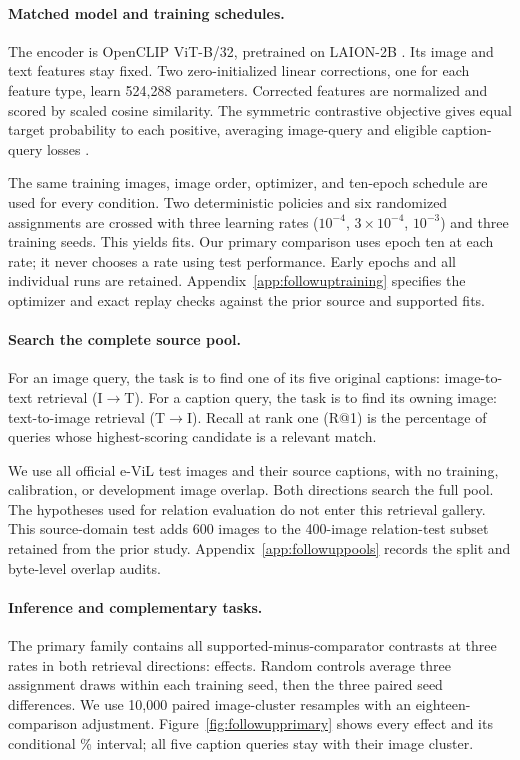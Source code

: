 \documentclass[11pt]{article}
\begin{document}
\paragraph{Matched model and training schedules.}
The encoder is OpenCLIP ViT-B/32, pretrained on LAION-2B \citep{cherti2023reproducible}. Its image and text features stay fixed. Two zero-initialized linear corrections, one for each feature type, learn 524,288 parameters. Corrected features are normalized and scored by scaled cosine similarity. The symmetric contrastive objective gives equal target probability to each positive, averaging image-query and eligible caption-query losses \citep{khosla2020supervised}.

The same \FuTrainImages{} training images, image order, optimizer, and ten-epoch schedule are used for every condition. Two deterministic policies and six randomized assignments are crossed with three learning rates ($10^{-4}$, $3\times10^{-4}$, $10^{-3}$) and three training seeds. This yields \FuFits{} fits. Our primary comparison uses epoch ten at each rate; it never chooses a rate using test performance. Early epochs and all individual runs are retained. Appendix~\ref{app:followuptraining} specifies the optimizer and exact replay checks against the prior source and supported fits.

\paragraph{Search the complete source pool.}
For an image query, the task is to find one of its five original captions: image-to-text retrieval (I$\to$T). For a caption query, the task is to find its owning image: text-to-image retrieval (T$\to$I). Recall at rank one (R@1) is the percentage of queries whose highest-scoring candidate is a relevant match.

We use all \FuTestImages{} official e-ViL test images and their \FuTestCaptions{} source captions, with no training, calibration, or development image overlap. Both directions search the full pool. The hypotheses used for relation evaluation do not enter this retrieval gallery. This source-domain test adds 600 images to the 400-image relation-test subset retained from the prior study. Appendix~\ref{app:followuppools} records the split and byte-level overlap audits.

\paragraph{Inference and complementary tasks.}
The primary family contains all supported-minus-comparator contrasts at three rates in both retrieval directions: \FuPrimaryFamily{} effects. Random controls average three assignment draws within each training seed, then the three paired seed differences. We use 10,000 paired image-cluster resamples with an eighteen-comparison adjustment. Figure~\ref{fig:followupprimary} shows every effect and its conditional \FuConfidence{}\% interval; all five caption queries stay with their image cluster.
\end{document}
